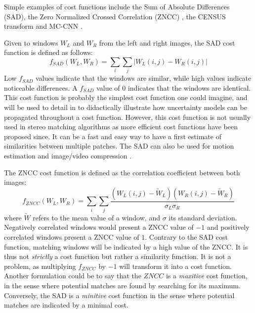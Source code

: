 \begin{example}\label{ex:cost_functions}
	Simple examples of cost functions include the Sum of Absolute Differences (SAD), the Zero Normalized Crossed Correlation (ZNCC)  \cite{hannah_computer_1994}, the CENSUS transform \cite{zabih_non-parametric_1994} and MC-CNN \cite{zbontar_stereo_2016}.
	
	Given to windows $W_L$ and $W_R$ from the left and right images, the SAD cost function is defined as follows:
	\begin{equation}
		f_{SAD}(W_L, W_R)  = \sum_i\sum_j | W_L(i,j) - W_R(i,j) |
	\end{equation}
	Low $f_{SAD}$ values indicate that the windows are similar, while high values indicate noticeable differences. A $f_{SAD}$ value of $0$ indicates that the windows are identical. This cost function is probably the simplest cost function one could imagine, and will be used to detail in  to didactically illustrate how uncertainty models can be propagated throughout a cost function. However, this cost function is not usually used in stereo matching algorithms as more efficient cost functions have been proposed since. It can be a fast and easy way to have a first estimate of similarities between multiple patches. The SAD can also be used for motion estimation and image/video compression \cite{richardson_h264_2006}.
	
	The ZNCC cost function is defined as the correlation coefficient between both images:
	\begin{equation}
		f_{ZNCC}(W_L, W_R)  = \sum_i\sum_j \frac{(W_L(i,j)  - \tilde{W}_L) (W_R(i,j)  - \tilde{W}_R) }{\sigma_L\sigma_R}
	\end{equation}
	where $\tilde{W}$ refers to the mean value of a window, and $\sigma$ its standard deviation. Negatively correlated windows would present a ZNCC value of $-1$ and positively correlated windows present a ZNCC value of $1$. Contrary to the SAD cost function, matching windows will be indicated by a high value of the ZNCC. It is thus not \textit{strictly} a cost function but rather a similarity function. It is not a problem, as multiplying $f_{ZNCC}$ by $-1$ will transform it into a cost function. Another formulation could be to say that the $ZNCC$ is a \textit{maxitive} cost function, in the sense where potential matches are found by searching for its maximum. Conversely, the SAD is a \textit{minitive} cost function in the sense where potential matches are indicated by a minimal cost.
	

\end{example}
